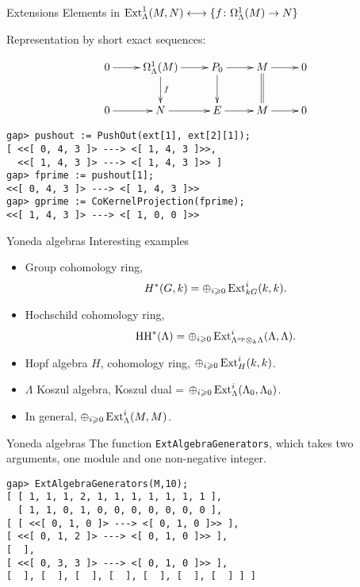 \begin{frame}[fragile]{Extensions}
Elements in $\operatorname{Ext}\nolimits^1_\Lambda(M,N) \longleftrightarrow \{f\colon
\Omega^1_\Lambda(M)\to N\}$

Representation by short exact sequences:

\[\xymatrix{
0\ar[r] & \Omega^1_\Lambda(M)\ar[r]\ar[d]^f & P_0\ar[r]\ar[d] &
M\ar[r]\ar@{=}[d] & 0\\
0\ar[r] & N \ar[r] & E\ar[r] & M\ar[r] & 0
}\]

\begin{verbatim}
gap> pushout := PushOut(ext[1], ext[2][1]);
[ <<[ 0, 4, 3 ]> ---> <[ 1, 4, 3 ]>>,
  <<[ 1, 4, 3 ]> ---> <[ 1, 4, 3 ]>> ]
gap> fprime := pushout[1];     
<<[ 0, 4, 3 ]> ---> <[ 1, 4, 3 ]>>
gap> gprime := CoKernelProjection(fprime); 
<<[ 1, 4, 3 ]> ---> <[ 1, 0, 0 ]>>
\end{verbatim}
\end{frame}

\begin{frame}[fragile]{Yoneda algebras}
Interesting examples
\begin{itemize}
\item Group cohomology ring, 
\[H^*(G,k) = \oplus_{i\geqslant 0} \operatorname{Ext}\nolimits^i_{kG}(k,k).\]
\item Hochschild cohomology ring, 
\[\operatorname{HH}\nolimits^*(\Lambda) = \oplus_{i\geqslant 0} \operatorname{Ext}\nolimits^i_{\Lambda^{\operatorname{op}\nolimits}\otimes_k\Lambda}(\Lambda,\Lambda).\] 
\item Hopf algebra $H$, cohomology ring, $\oplus_{i\geqslant 0}
  \operatorname{Ext}\nolimits^i_H(k,k)$. 
\item $\Lambda$ Koszul algebra, Koszul dual = $\oplus_{i\geqslant 0}
  \operatorname{Ext}\nolimits^i_\Lambda(\Lambda_0,\Lambda_0)$. 
\item In general, $\oplus_{i\geqslant 0} \operatorname{Ext}\nolimits^i_\Lambda(M,M)$. 
\end{itemize}
\end{frame}

\begin{frame}[fragile]{Yoneda algebras}
  The function \texttt{ExtAlgebraGenerators}, which takes two
  arguments, one module and one non-negative integer.
\begin{verbatim}
gap> ExtAlgebraGenerators(M,10);
[ [ 1, 1, 1, 2, 1, 1, 1, 1, 1, 1, 1 ], 
  [ 1, 1, 0, 1, 0, 0, 0, 0, 0, 0, 0 ], 
[ [ <<[ 0, 1, 0 ]> ---> <[ 0, 1, 0 ]>> ], 
[ <<[ 0, 1, 2 ]> ---> <[ 0, 1, 0 ]>> ], 
[  ], 
[ <<[ 0, 3, 3 ]> ---> <[ 0, 1, 0 ]>> ], 
[  ], [  ], [  ], [  ], [  ], [  ], [  ] ] ]
\end{verbatim}
\end{frame}

